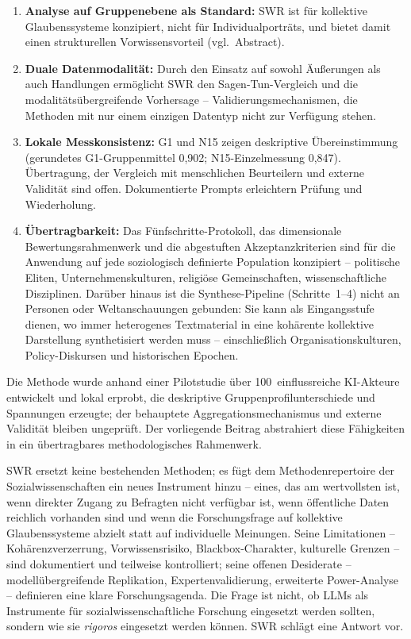 \documentclass[11pt,a4paper]{article}
\begin{document}
\begin{enumerate}[nosep]
  \item \textbf{Analyse auf Gruppenebene als Standard:} SWR ist für kollektive Glaubenssysteme konzipiert, nicht für Individualporträts, und bietet damit einen strukturellen Vorwissensvorteil (vgl.\ Abstract).
  \item \textbf{Duale Datenmodalität:} Durch den Einsatz auf sowohl Äußerungen als auch Handlungen ermöglicht SWR den Sagen-Tun-Vergleich und die modalitätsübergreifende Vorhersage -- Validierungsmechanismen, die Methoden mit nur einem einzigen Datentyp nicht zur Verfügung stehen.
  \item \textbf{Lokale Messkonsistenz:} G1 und N15 zeigen deskriptive Übereinstimmung (gerundetes G1-Gruppenmittel 0,902; N15-Einzelmessung 0,847). Übertragung, der Vergleich mit menschlichen Beurteilern und externe Validität sind offen. Dokumentierte Prompts erleichtern Prüfung und Wiederholung.
  \item \textbf{Übertragbarkeit:} Das Fünfschritte-Protokoll, das dimensionale Bewertungsrahmenwerk und die abgestuften Akzeptanzkriterien sind für die Anwendung auf jede soziologisch definierte Population konzipiert -- politische Eliten, Unternehmenskulturen, religiöse Gemeinschaften, wissenschaftliche Disziplinen. Darüber hinaus ist die Synthese-Pipeline (Schritte~1--4) nicht an Personen oder Weltanschauungen gebunden: Sie kann als Eingangsstufe dienen, wo immer heterogenes Textmaterial in eine kohärente kollektive Darstellung synthetisiert werden muss -- einschließlich Organisationskulturen, Policy-Diskursen und historischen Epochen.
\end{enumerate}

Die Methode wurde anhand einer Pilotstudie über 100~einflussreiche KI-Akteure~\citep{Geiger2026PaperA} entwickelt und lokal erprobt, die deskriptive Gruppenprofilunterschiede und Spannungen erzeugte; der behauptete Aggregationsmechanismus und externe Validität bleiben ungeprüft. Der vorliegende Beitrag abstrahiert diese Fähigkeiten in ein übertragbares methodologisches Rahmenwerk.

SWR ersetzt keine bestehenden Methoden; es fügt dem Methodenrepertoire der Sozialwissenschaften ein neues Instrument hinzu -- eines, das am wertvollsten ist, wenn direkter Zugang zu Befragten nicht verfügbar ist, wenn öffentliche Daten reichlich vorhanden sind und wenn die Forschungsfrage auf kollektive Glaubenssysteme abzielt statt auf individuelle Meinungen. Seine Limitationen -- Kohärenzverzerrung, Vorwissensrisiko, Blackbox-Charakter, kulturelle Grenzen -- sind dokumentiert und teilweise kontrolliert; seine offenen Desiderate -- modellübergreifende Replikation, Expertenvalidierung, erweiterte Power-Analyse -- definieren eine klare Forschungsagenda. Die Frage ist nicht, ob LLMs als Instrumente für sozialwissenschaftliche Forschung eingesetzt werden sollten, sondern wie sie \emph{rigoros} eingesetzt werden können. SWR schlägt eine Antwort vor.
\end{document}

